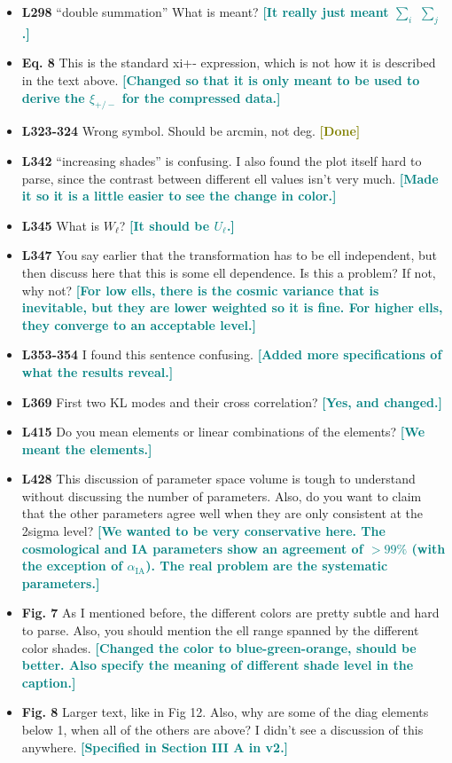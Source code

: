 \documentclass{article}
\newcommand\reply[1]{{\bf {\textcolor{teal}{[#1]}}}}
\newcommand\done{{\bf {\textcolor{olive}{[Done]}}}}
\begin{document}
\begin{itemize}
	\item \textbf{L298} “double summation” What is meant? \reply{It really just meant $\sum_i$ $\sum_j$.}
	\item \textbf{Eq. 8} This is the standard xi+- expression, which is not how it is described in the text above. \reply{Changed so that it is only meant to be used to derive the $\xi_{+/-}$ for the compressed data.}
	\item \textbf{L323-324} Wrong symbol. Should be arcmin, not deg. \done
	\item \textbf{L342} “increasing shades” is confusing. I also found the plot itself hard to parse, since the contrast between different ell values isn’t very much. \reply{Made it so it is a little easier to see the change in color.}
	\item \textbf{L345} What is $W_\ell$? \reply{It should be $U_\ell$.}
	\item \textbf{L347} You say earlier that the transformation has to be ell independent, but then discuss here that this is some ell dependence. Is this a problem? If not, why not? \reply{For low ells, there is the cosmic variance that is inevitable, but they are lower weighted so it is fine. For higher ells, they converge to an acceptable level.}
	\item\textbf{ L353-354} I found this sentence confusing. \reply{Added more specifications of what the results reveal.}
	\item \textbf{L369} First two KL modes and their cross correlation? \reply{Yes, and changed.}
	\item \textbf{L415} Do you mean elements or linear combinations of the elements? \reply{We meant the elements.}
	\item \textbf{L428} This discussion of parameter space volume is tough to understand without discussing the number of parameters.  Also, do you want to claim that the other parameters agree well when they are only consistent at the 2sigma level? \reply{We wanted to be very conservative here. The cosmological and IA parameters show an agreement of $> 99\%$ (with the exception of $\alpha_{\mathrm{IA}}$). The real problem are the systematic parameters.}
	\item \textbf{Fig. 7} As I mentioned before, the different colors are pretty subtle and hard to parse. Also, you should mention the ell range spanned by the different color shades. \reply{Changed the color to blue-green-orange, should be better. Also specify the meaning of different shade level in the caption.}
	\item \textbf{Fig. 8} Larger text, like in Fig 12. Also, why are some of the diag elements below 1, when all of the others are above? I didn’t see a discussion of this anywhere. \reply{Specified in Section III A in v2.}

\end{itemize}
\end{document}
